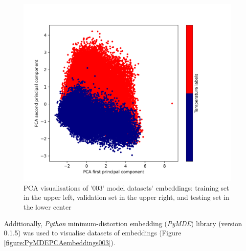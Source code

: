 \documentclass[12pt]{report}
\begin{document}
\begin{figure}[h!]
		\includegraphics[scale=0.3]{003_test_v2_PCA.png}

		\caption{PCA visualisations of '003' model datasets' embeddings: training set
				in the upper left, validation set in the upper right, and 
				testing set in the lower center}
		\label{figure:ScikitPCAembeddings003}
	\end{figure}
	
	Additionally, \textit{Python} minimum-distortion embedding (\textit{PyMDE}) 
	library (version 0.1.5) was used to visualise datasets of embeddings 
	(Figure \ref{figure:PyMDEPCAembeddings003}).
\end{document}

